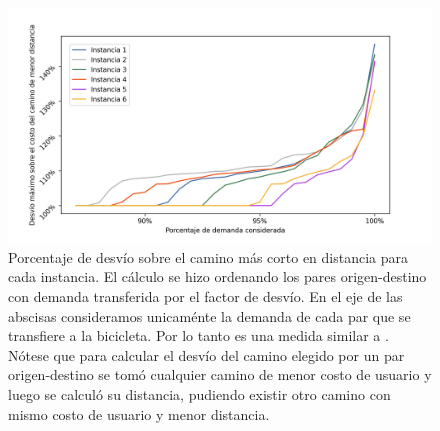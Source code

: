 \begin{figure}[h!]
  \centering
  \includegraphics[width=\linewidth]{../resources/montevideo_shortest_path_distance_deviation.png}
  \caption{Porcentaje de desvío sobre el camino más corto en distancia para cada instancia. El cálculo se hizo ordenando los pares origen-destino con demanda transferida por el factor de desvío. En el eje de las abscisas consideramos unicaménte la demanda de cada par que se transfiere a la bicicleta. Por lo tanto es una medida similar a \textcite{winters2010}. Nótese que para calcular el desvío del camino elegido por un par origen-destino se tomó cualquier camino de menor costo de usuario y luego se calculó su distancia, pudiendo existir otro camino con mismo costo de usuario y menor distancia.}
  \label{fig:montevideoshortestpathdeviation}
\end{figure}


